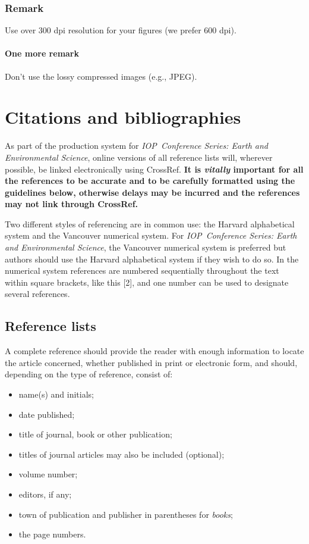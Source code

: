 \documentclass[a4paper]{jpconf}
\newcommand{\ees}{\textit{IOP~Conference Series: Earth and Environmental Science}}
\begin{document}
\subsubsection{Remark}
Use over 300 dpi resolution for your figures (we prefer 600 dpi).
\paragraph{One more remark}
Don't use the lossy compressed images (e.g., JPEG). 

\section{Citations and bibliographies}

As part of the production system for \ees{}, online versions of all reference lists will, wherever possible, be linked electronically using CrossRef. \textbf{It is \textit{vitally} important for all the references to be accurate and to be carefully formatted using the guidelines below, otherwise delays may be incurred and the references may not link through CrossRef.}

Two different styles of referencing are in common use: the Harvard alphabetical system and the Vancouver numerical system.  For \ees{}, the Vancouver numerical system is preferred but authors should use the Harvard alphabetical system if they wish to do so. In the numerical system references are numbered sequentially throughout the text within square brackets, like this [2], and one number can be used to designate several references.  

\subsection{Reference lists}
A complete reference should provide the reader with enough information to locate the article concerned, whether published in print or electronic form, and should, depending on the type of reference, consist of:  

\begin{itemize}
\item name(s) and initials;
\item date published;
\item title of journal, book or other publication; 
\item titles of journal articles may also be included (optional);
\item volume number;
\item editors, if any;
\item town of publication and publisher in parentheses for {\it books};
\item the page numbers.
\end{itemize}
\end{document}
